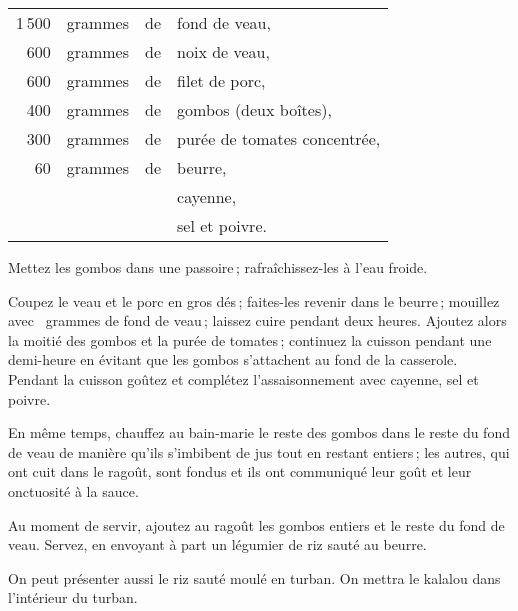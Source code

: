 \footnotesize
\begin{longtable}{rrrp{16em}}
  1 500 & grammes & de & fond de veau,                                                                    \\
    600 & grammes & de & noix de veau,                                                                    \\
    600 & grammes & de & filet de porc,                                                                   \\
    400 & grammes & de & gombos (deux boîtes),                                                            \\
    300 & grammes & de & purée de tomates concentrée,                                                     \\
     60 & grammes & de & beurre,                                                                          \\
        &         &    & cayenne,                                                                         \\
        &         &    & sel et poivre.                                                                   \\
\end{longtable}
\normalsize

Mettez les gombos dans une passoire ; rafraîchissez-les à l'eau froide.

Coupez le veau et le porc en gros dés ; faites-les revenir dans le beurre ;
mouillez avec {\mmm} {\mmm} grammes de fond de veau ; laissez cuire
pendant deux heures. Ajoutez alors la moitié des gombos et la purée de
tomates ; continuez la cuisson pendant une demi-heure en évitant que les gombos
s'attachent au fond de la casserole. Pendant la cuisson goûtez et complétez
l'assaisonnement avec cayenne, sel et poivre.

En même temps, chauffez au bain-marie le reste des gombos dans le reste du fond
de veau de manière qu'ils s'imbibent de jus tout en restant entiers ; les
autres, qui ont cuit dans le ragoût, sont fondus et ils ont communiqué leur
goût et leur onctuosité à la sauce.

Au moment de servir, ajoutez au ragoût les gombos entiers et le reste du fond
de veau. Servez, en envoyant à part un légumier de riz sauté au beurre.


\sk

On peut présenter aussi le riz sauté moulé en turban. On mettra le kalalou dans
l'intérieur du turban.

